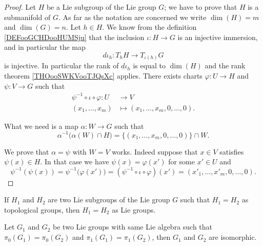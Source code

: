 \begin{proof}
	Let \( H\) be a Lie subgroup of the Lie group \( G\); we have to prove that \( H\) is a submanifold of \( G\). As far as the notation are concerned we write \( \dim(H)=m\) and \( \dim(G)=n\). Let \( h\in H\). We know from the definition \ref{DEFooGCHDooHUMSju} that the inclusion \( \iota\colon H\to G\) is an injective immersion, and in particular the map
	\begin{equation}
		d\iota_h\colon T_hH\to T_{\iota(h)}G
	\end{equation}
	is injective. In particular the rank of \( d\iota_h\) is equal to \( \dim(H)\) and the rank theorem \ref{THOooSWKVooTJQsXc} applies. There exists charts \( \varphi\colon U\to H\) and \( \psi\colon V\to G\) such that
	\begin{equation}
		\begin{aligned}
			\psi^{-1}\circ\iota\circ\varphi\colon U & \to V                                  \\
			(x_1,\ldots, x_m)                       & \mapsto (x_1,\ldots, x_m,0,\ldots, 0).
		\end{aligned}
	\end{equation}

	What we need is a map \( \alpha\colon W\to G\) such that
	\begin{equation}
		\alpha^{-1}\big( \alpha(W)\cap H \big)=\{ (x_1,\ldots, x_m,0,\ldots, 0) \}\cap W.
	\end{equation}

	We prove that \( \alpha=\psi\) with \( W=V\) works. Indeed suppose that \( x\in V\) satisfies \( \psi(x)\in H\). In that case we have \( \psi(x)=\varphi(x')\) for some \( x'\in U\) and
	\begin{equation}
		\psi^{-1}(\psi(x))=\psi^{-1}\big( \varphi(x') \big)=(\psi^{-1}\circ\iota\circ\varphi)(x')=(x'_1,\ldots, x'_m,0,\ldots, 0).
	\end{equation}
\end{proof}

\begin{corollary} \label{CORooMCWWooXkpkNO}
	If $H_1$ and $H_2$ are two Lie subgroups of the Lie group $G$  such that $H_1=H_2$ as topological groups, then $H_1=H_2$ as Lie groups.
\end{corollary}

\begin{proposition}
	Let $G_1$ and $G_2$ be two Lie groups with same Lie algebra such that $\pi_0(G_1)=\pi_0(G_2)$ and $\pi_1(G_1)=\pi_1(G_2)$, then $G_1$ and $G_2$ are isomorphic.
\end{proposition}

